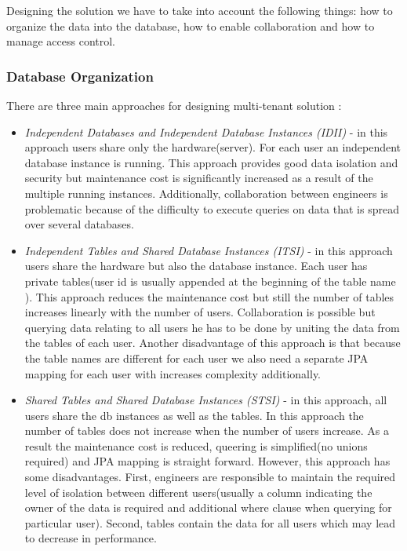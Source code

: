 Designing the solution we have to take into account the following things: how to organize the data into the database, how to enable collaboration and how to manage access control.

\subsubsection{Database Organization}
There are three main approaches for designing multi-tenant solution \cite{Hui}:

\begin{itemize}
	\item \textit{Independent Databases and Independent Database Instances (IDII)} - in this approach users share only the hardware(server). For each user an independent database instance is running. This approach provides good data isolation and security but maintenance cost is significantly increased as a result of the multiple running instances. Additionally, collaboration between engineers is problematic because of the difficulty to execute queries on data that is spread over several databases.  
	
	\item \textit{Independent Tables and Shared Database Instances (ITSI)} - in this approach users share the hardware but also the database instance. Each user has private tables(user id is usually appended at the beginning of the table name \cite{Hui}). This approach reduces the maintenance cost but still the number of tables increases linearly with the number of users. Collaboration is possible but querying data relating to all users he has to be done by uniting the data from the tables of each user. Another disadvantage of this approach is that because the table names are different for each user we also need a separate JPA mapping for each user with increases complexity additionally.
	
	\item \textit{Shared Tables and Shared Database Instances (STSI)} - in this approach, all users share the db instances as well as the tables. In this approach the number of tables does not increase when the number of users increase. As a result the maintenance cost is reduced, queering is simplified(no unions required) and JPA mapping is straight forward. However, this approach has some disadvantages. First, engineers are responsible to maintain the required level of isolation between different users(usually a column indicating the owner of the data is required and additional where clause when querying for particular user). Second, tables contain the data for all users which may lead to decrease in performance.
	
\end{itemize}

